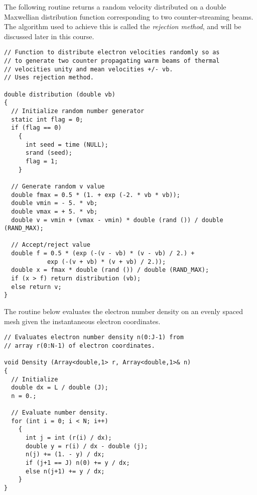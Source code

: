 The following routine returns a random velocity distributed on a double Maxwellian distribution function corresponding
to two counter-streaming beams. The algorithm used to achieve this is
called the {\em rejection method}, and will be discussed later in
this course.
\begin{verbatim}
// Function to distribute electron velocities randomly so as 
// to generate two counter propagating warm beams of thermal
// velocities unity and mean velocities +/- vb.
// Uses rejection method.

double distribution (double vb)
{ 
  // Initialize random number generator
  static int flag = 0;
  if (flag == 0)
    {
      int seed = time (NULL);
      srand (seed);
      flag = 1;
    }

  // Generate random v value
  double fmax = 0.5 * (1. + exp (-2. * vb * vb));
  double vmin = - 5. * vb;
  double vmax = + 5. * vb;
  double v = vmin + (vmax - vmin) * double (rand ()) / double (RAND_MAX);

  // Accept/reject value
  double f = 0.5 * (exp (-(v - vb) * (v - vb) / 2.) +
		    exp (-(v + vb) * (v + vb) / 2.));
  double x = fmax * double (rand ()) / double (RAND_MAX);
  if (x > f) return distribution (vb);
  else return v;
}
\end{verbatim}

The routine below evaluates the electron number density on an evenly
spaced mesh given the instantaneous electron coordinates.
\begin{verbatim}
// Evaluates electron number density n(0:J-1) from 
// array r(0:N-1) of electron coordinates.

void Density (Array<double,1> r, Array<double,1>& n)
{
  // Initialize 
  double dx = L / double (J);
  n = 0.;

  // Evaluate number density.
  for (int i = 0; i < N; i++)
    {
      int j = int (r(i) / dx);
      double y = r(i) / dx - double (j);
      n(j) += (1. - y) / dx;
      if (j+1 == J) n(0) += y / dx;
      else n(j+1) += y / dx;
    }
}
\end{verbatim}


